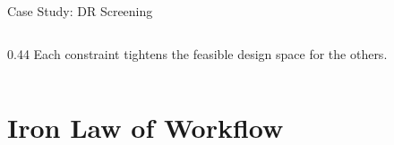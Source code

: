 \documentclass[aspectratio=169, 12pt]{beamer}
\begin{document}
\begin{frame}{Case Study: DR Screening}
\begin{columns}[T]
\begin{column}{0.44\textwidth}
    \vspace{0.05cm}
    {\scriptsize\textcolor{midgray}{Each constraint tightens the feasible design space for the others.}}
  \end{column}
\end{columns}

\end{frame}

\section{Iron Law of Workflow}

\end{document}
